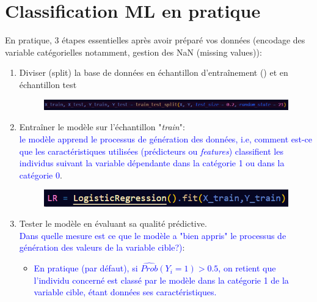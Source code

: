 \documentclass[12pt,aspectratio=1610]{beamer}
\begin{document}
\section{Classification ML en pratique}
\begin{frame}
	En pratique, 3 étapes essentielles après avoir préparé vos données (encodage des variable catégorielles notamment, gestion des NaN (missing values)): 
	\begin{enumerate}
		\item Diviser (split) la base de données en échantillon d'entraînement () et en échantillon test \\
		
		\begin{figure}
			\centering
			\includegraphics[width=1.0\linewidth]{split_data}
		\end{figure}
		
		
		\item Entraîner le modèle sur l'échantillon "\textit{train}": \\
		\textcolor{blue}{le modèle apprend le processus de génération des données, i.e, comment est-ce que les caractéristiques utilisées (prédicteurs ou \textit{features}) classifient les individus suivant la variable dépendante dans la catégorie 1 ou dans la catégorie 0}.
		\begin{figure}
			\centering
			\includegraphics[width=0.7\linewidth]{train}
		\end{figure}
		
		
		\item  Tester le modèle en  évaluant  sa qualité prédictive. \\
		\textcolor{blue}{Dans quelle mesure est ce que le modèle a "bien appris" le processus de génération des valeurs de la variable cible?)}: \\
		\begin{itemize}
		\item		\textcolor{blue}{En pratique (par défaut), si $\widehat{Prob} (Y_i=1)>0.5$, on retient que l'individu concerné est classé par le modèle dans la catégorie 1 de la variable cible, étant données ses caractéristiques.}
		\end{itemize}
	\end{enumerate}
	
	
\end{frame}
\end{document}
